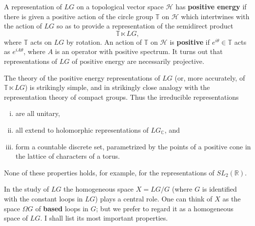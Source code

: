 \documentclass[12pt]{article}
\begin{document}
    \begin{definition}
        A representation of \(LG\) on a topological vector space \(\mathcal H\) has \textbf{positive energy} if there is given a positive action of the circle group \(\mathbb{T}\) on \(\mathcal H\) which intertwines with the action of \(LG\) so as to provide a representation of the semidirect product
\[
\mathbb{T} \ltimes LG,
\]where \(\mathbb{T}\) acts on \(LG\) by rotation. An action of \(\mathbb{T}\) on \(\mathcal H\) is \textbf{positive} if \(e^{i\theta} \in \mathbb{T}\) acts as \(e^{iA\theta}\), where \(A\) is an operator with positive spectrum. It turns out that representations of \(LG\) of positive energy are necessarily projective.
    \end{definition}


The theory of the positive energy representations of \(LG\) (or, more accurately, of \(\mathbb{T} \ltimes LG\)) is strikingly simple, and in strikingly close analogy with the representation theory of compact groups. Thus the irreducible representations
\begin{enumerate}[(i)]
\item are all unitary,
\item all extend to holomorphic representations of \(LG_\mathbb{C}\), and
\item form a countable discrete set, parametrized by the points of a positive cone in the lattice of characters of a torus.
\end{enumerate}
None of these properties holds, for example, for the representations of \(SL_2(\mathbb{R})\).

In the study of \(LG\) the homogeneous space \(X = LG/G\) (where \(G\) is identified with the constant loops in \(LG\)) plays a central role.  
One can think of \(X\) as the space \(\Omega G\) of \textbf{based} loops in \(G\); but we prefer to regard it as a homogeneous space of \(LG\).  
I shall list its most important properties.
\end{document}
